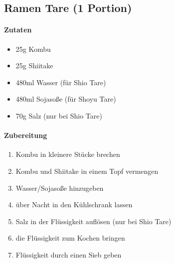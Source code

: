 \newpage
\subsection{Ramen Tare (1 Portion)}
\paragraph{Zutaten}
\begin{itemize}[noitemsep]
	\item 25g Kombu
	\item 25g Shiitake 
	\item 480ml Wasser (für Shio Tare)
	\item 480ml Sojasoße (für Shoyu Tare)
	\item 70g Salz (nur bei Shio Tare)
\end{itemize}
\paragraph{Zubereitung}
\begin{enumerate}[noitemsep]
	\item Kombu in kleinere Stücke brechen 
	\item Kombu und Shiitake in einem Topf vermengen
	\item Wasser/Sojasoße hinzugeben
	\item über Nacht in den Kühlschrank lassen 
	\item Salz in der Flüssigkeit auflösen (nur bei Shio Tare) 
	\item die Flüssigkeit zum Kochen bringen
	\item Flüssigkeit durch einen Sieb geben
\end{enumerate}
